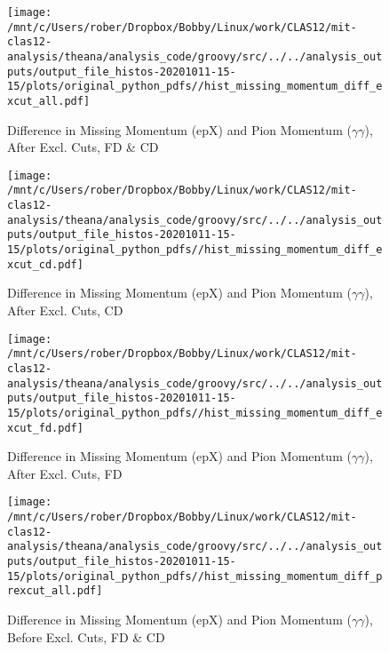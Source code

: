 \documentclass{article}
\begin{document}
\begin{landscape}
\begin{figure}[h]
        \texttt{[image: /mnt/c/Users/rober/Dropbox/Bobby/Linux/work/CLAS12/mit-clas12-analysis/theana/analysis\_code/groovy/src/../../analysis\_outputs/output\_file\_histos-20201011-15-15/plots/original\_python\_pdfs//hist\_missing\_momentum\_diff\_excut\_all.pdf]}
        \captionsetup{textformat=empty,labelformat=blank}
        \caption{Difference in Missing Momentum (epX) and Pion Momentum ($\gamma$$\gamma$), After Excl. Cuts, FD \& CD}
    \end{figure}
    \clearpage
    
    \begin{figure}[h]
        \centering

        \texttt{[image: /mnt/c/Users/rober/Dropbox/Bobby/Linux/work/CLAS12/mit-clas12-analysis/theana/analysis\_code/groovy/src/../../analysis\_outputs/output\_file\_histos-20201011-15-15/plots/original\_python\_pdfs//hist\_missing\_momentum\_diff\_excut\_cd.pdf]}
        \captionsetup{textformat=empty,labelformat=blank}
        \caption{Difference in Missing Momentum (epX) and Pion Momentum ($\gamma$$\gamma$), After Excl. Cuts, CD}
    \end{figure}
    \clearpage
    
    \begin{figure}[h]
        \centering

        \texttt{[image: /mnt/c/Users/rober/Dropbox/Bobby/Linux/work/CLAS12/mit-clas12-analysis/theana/analysis\_code/groovy/src/../../analysis\_outputs/output\_file\_histos-20201011-15-15/plots/original\_python\_pdfs//hist\_missing\_momentum\_diff\_excut\_fd.pdf]}
        \captionsetup{textformat=empty,labelformat=blank}
        \caption{Difference in Missing Momentum (epX) and Pion Momentum ($\gamma$$\gamma$), After Excl. Cuts, FD}
    \end{figure}
    \clearpage
    
    \begin{figure}[h]
        \centering

        \texttt{[image: /mnt/c/Users/rober/Dropbox/Bobby/Linux/work/CLAS12/mit-clas12-analysis/theana/analysis\_code/groovy/src/../../analysis\_outputs/output\_file\_histos-20201011-15-15/plots/original\_python\_pdfs//hist\_missing\_momentum\_diff\_prexcut\_all.pdf]}
        \captionsetup{textformat=empty,labelformat=blank}
        \caption{Difference in Missing Momentum (epX) and Pion Momentum ($\gamma$$\gamma$), Before Excl. Cuts, FD \& CD}
    \end{figure}
    \clearpage
    
    \begin{figure}[h]
        \centering


\end{figure}
\end{landscape}
\end{document}
